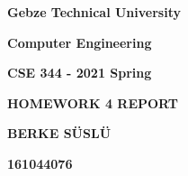 \documentclass[12pt]{article}
\begin{document}
\vspace{\baselineskip}

\vspace{\baselineskip}

\vspace{\baselineskip}

\vspace{\baselineskip}

\vspace{\baselineskip}

\vspace{\baselineskip}
\begin{Center}
{\fontsize{16pt}{19.2pt}\selectfont \textbf{Gebze Technical University}}
\end{Center}
\begin{Center}
{\fontsize{16pt}{19.2pt}\selectfont \textbf{Computer Engineering}}
\end{Center}

\vspace{\baselineskip}

\vspace{\baselineskip}

\vspace{\baselineskip}
\begin{Center}
{\fontsize{16pt}{19.2pt}\selectfont \textbf{CSE 344 - 2021 Spring}}
\end{Center}

\vspace{\baselineskip}

\vspace{\baselineskip}

\vspace{\baselineskip}
\begin{Center}
{\fontsize{16pt}{19.2pt}\selectfont \textbf{HOMEWORK 4 REPORT}}
\end{Center}

\vspace{\baselineskip}

\vspace{\baselineskip}

\vspace{\baselineskip}

\vspace{\baselineskip}

\vspace{\baselineskip}

\vspace{\baselineskip}

\vspace{\baselineskip}
\begin{Center}
{\fontsize{16pt}{19.2pt}\selectfont \textbf{BERKE SÜSLÜ}}
\end{Center}
\begin{Center}
{\fontsize{16pt}{19.2pt}\selectfont \textbf{161044076}}
\end{Center}
\end{document}
